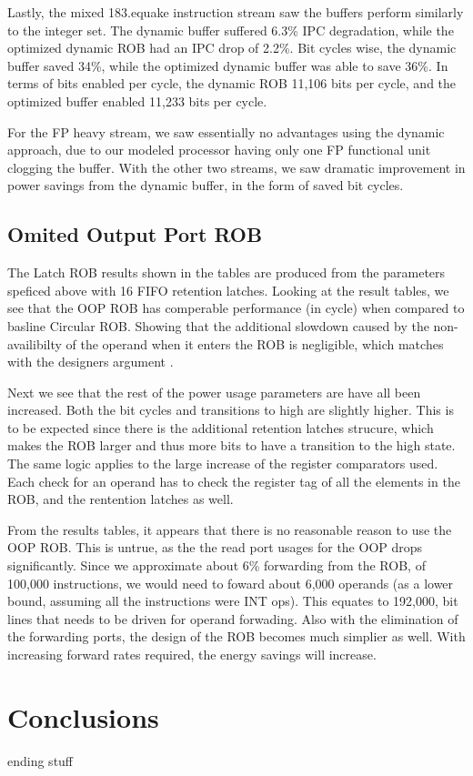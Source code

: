 Lastly, the mixed 183.equake instruction stream saw the buffers perform similarly to the integer set. The dynamic buffer suffered 6.3\% IPC degradation, while the optimized dynamic ROB had an IPC drop of 2.2\%. Bit cycles wise, the dynamic buffer saved 34\%, while the optimized dynamic buffer was able to save 36\%. In terms of bits enabled per cycle, the dynamic ROB 11,106 bits per cycle, and the optimized buffer enabled 11,233 bits per cycle.

For the FP heavy stream, we saw essentially no advantages using the dynamic approach, due to our modeled processor having only one FP functional unit clogging the buffer. With the other two streams, we saw dramatic improvement in power savings from the dynamic buffer, in the form of saved bit cycles.

\subsection{Omited Output Port ROB}
The Latch ROB results shown in the tables are produced from the parameters 
speficed above with 16 FIFO retention latches. Looking at the result tables,
 we see that the OOP ROB has comperable performance (in cycle) when compared 
to basline Circular ROB.  Showing that the additional slowdown caused by the
 non-availibilty of the operand when it enters the ROB is negligible, which
matches with the designers argument \cite{kucuk}.  

Next we see that the rest of the power usage parameters are have all been 
increased.  Both the bit cycles and transitions to high are slightly higher.
This is to be expected since there is the additional retention latches 
strucure, which makes the ROB larger and thus more bits to have a transition
to the high state.  The same logic applies to the large increase of the
register comparators used.  Each check for an operand has to check the
register tag of all the elements in the ROB, and the rentention latches 
as well.  

From the results tables, it appears that there is no reasonable reason to use
the OOP ROB.  This is untrue, as the the read port usages for the OOP drops
significantly.  Since we approximate about 6\% forwarding from the ROB, of 
100,000 instructions, we would need to foward about 6,000 operands (as a
lower bound, assuming all the instructions were INT ops).  This equates to
192,000, bit lines that needs to be driven for operand forwading.  Also with
the elimination of the forwarding ports, the design of the ROB becomes much 
simplier as well. With increasing forward rates required, the energy savings
will increase.


\section{Conclusions}
ending stuff
